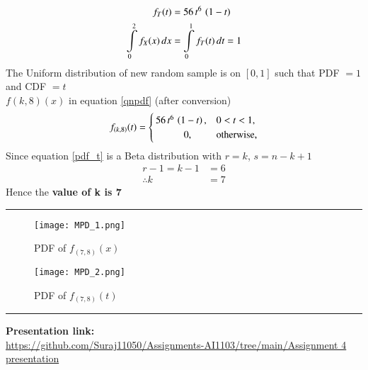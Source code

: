 \documentclass[journal,12pt,twocolumn]{IEEEtran}
\begin{document}
\begin{align}
f_{T}(t) &= 56\,t^{6}\,\left(1-t\right) \\
\int\limits_{0}^{2}f_{X}(x)\,dx &=  \int\limits_{0}^{1}f_{T}(t)\,dt = 1
\end{align}
The Uniform distribution of new random sample is on $[0,1]$ such that   PDF $= 1$ and CDF $= t$ \\
$f(k,8)(x)$ in equation \eqref{qnpdf}  (after conversion)
\begin{align}
f_{(k,8)}(t) =
  \begin{cases}
      56\,t^{6}\,\left(1-t\right),  & 0<t<1, \\ 
      \hspace{1cm}   0,               & \text{otherwise,} 
  \end{cases}
  \label{pdf_t}
\end{align}
Since equation \eqref{pdf_t} is a Beta distribution with $r=k$, $s=n-k+1$  
\begin{align}
r-1 = k-1 &= 6 \\
\therefore k &= 7 
\end{align}
Hence the \textbf{value of k is 7}
\vspace{0.5cm}
\hrule
\begin{figure}[htp]
    \centering
    \texttt{[image: MPD\_1.png]}
    \label{fig:maginal probability density 1}
    \caption{PDF of $f_{(7,8)}(x)$}
\centering
    \texttt{[image: MPD\_2.png]}
    \label{fig:maginal probability density 2}
    \caption{PDF of $f_{(7,8)}(t)$}
\end{figure}
\hrule
\vspace{0.5cm}
\begin{center}
\textbf{Presentation link:} \\
\url{https://github.com/Suraj11050/Assignments-AI1103/tree/main/Assignment 4 presentation}
\end{center}
\end{document}
